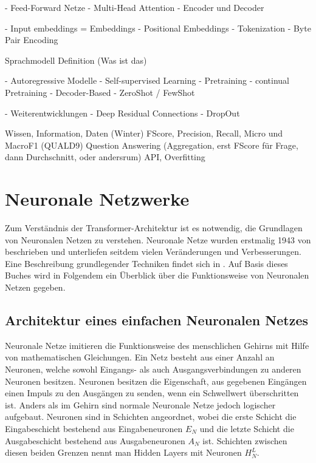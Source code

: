 - Feed-Forward Netze
- Multi-Head Attention
- Encoder und Decoder

- Input embeddings = Embeddings
- Positional Embeddings
- Tokenization %
    - Byte Pair Encoding %


Sprachmodell Definition (Was ist das)

- Autoregressive Modelle %
    - Self-supervised Learning %
    - Pretraining
    - continual Pretraining
    - Decoder-Based %
    - ZeroShot / FewShot

- Weiterentwicklungen
    - Deep Residual Connections %
    - DropOut   %

Wissen, Information, Daten (Winter)
FScore, Precision, Recall, Micro und MacroF1 (QUALD9)
Question Answering (Aggregation, erst FScore für Frage, dann Durchschnitt, oder andersrum)
API, Overfitting

\section{Neuronale Netzwerke}
Zum Verständnis der Transformer-Architektur ist es notwendig, die Grundlagen von Neuronalen Netzen zu verstehen.
Neuronale Netze wurden erstmalig 1943 von \citet{neuronal_networks_first} beschrieben und unterliefen seitdem vielen Veränderungen und Verbesserungen.
Eine Beschreibung grundlegender Techniken findet sich in \citet{neuronale-netze}. Auf Basis dieses Buches wird in Folgendem ein Überblick über die Funktionsweise von Neuronalen Netzen gegeben.\\

\subsection{Architektur eines einfachen Neuronalen Netzes}
Neuronale Netze imitieren die Funktionsweise des menschlichen Gehirns mit Hilfe von mathematischen Gleichungen.
Ein Netz besteht aus einer Anzahl an Neuronen, welche sowohl Eingangs- als auch Ausgangsverbindungen zu anderen Neuronen besitzen.
Neuronen besitzen die Eigenschaft, aus gegebenen Eingängen einen Impuls zu den Ausgängen zu senden, wenn ein Schwellwert überschritten ist.
Anders als im Gehirn sind normale Neuronale Netze jedoch logischer aufgebaut.
Neuronen sind in Schichten angeordnet, wobei die erste Schicht die Eingabeschicht bestehend aus Eingabeneuronen $E_N$ und die letzte Schicht die Ausgabeschicht bestehend aus Ausgabeneuronen $A_N$ ist.
Schichten zwischen diesen beiden Grenzen nennt man Hidden Layers mit Neuronen $H^L_N$.\\


